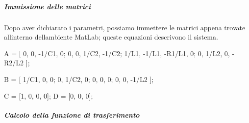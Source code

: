 \documentclass[
]{article}
\newenvironment{Shaded}{}{}
\newcommand{\FloatTok}[1]{\textcolor[rgb]{0.25,0.63,0.44}{#1}}
\newcommand{\NormalTok}[1]{#1}
\newcommand{\OperatorTok}[1]{\textcolor[rgb]{0.40,0.40,0.40}{#1}}
\newcommand{\VariableTok}[1]{\textcolor[rgb]{0.10,0.09,0.49}{#1}}
\begin{document}
\hypertarget{immissione-delle-matrici}{%
\subparagraph{Immissione delle matrici}\label{immissione-delle-matrici}}

Dopo aver dichiarato i parametri, possiamo immettere le matrici appena
trovate all\textquotesingle interno dell\textquotesingle ambiente
MatLab; queste equazioni descrivono il sistema.

\begin{Shaded}
\begin{Highlighting}[]
\VariableTok{A} \OperatorTok{=}\NormalTok{ [   }\FloatTok{0}\OperatorTok{,}      \FloatTok{0}\OperatorTok{,}      \OperatorTok{{-}}\FloatTok{1}\OperatorTok{/}\VariableTok{C1}\OperatorTok{,}      \FloatTok{0}\OperatorTok{;}
        \FloatTok{0}\OperatorTok{,}      \FloatTok{0}\OperatorTok{,}      \FloatTok{1}\OperatorTok{/}\VariableTok{C2}\OperatorTok{,}       \OperatorTok{{-}}\FloatTok{1}\OperatorTok{/}\VariableTok{C2}\OperatorTok{;}
        \FloatTok{1}\OperatorTok{/}\VariableTok{L1}\OperatorTok{,}   \OperatorTok{{-}}\FloatTok{1}\OperatorTok{/}\VariableTok{L1}\OperatorTok{,}  \OperatorTok{{-}}\VariableTok{R1}\OperatorTok{/}\VariableTok{L1}\OperatorTok{,}      \FloatTok{0}\OperatorTok{;}
        \FloatTok{0}\OperatorTok{,}      \FloatTok{1}\OperatorTok{/}\VariableTok{L2}\OperatorTok{,}   \FloatTok{0}\OperatorTok{,}          \OperatorTok{{-}}\VariableTok{R2}\OperatorTok{/}\VariableTok{L2}
\NormalTok{    ]}\OperatorTok{;}

\VariableTok{B} \OperatorTok{=}\NormalTok{ [   }\FloatTok{1}\OperatorTok{/}\VariableTok{C1}\OperatorTok{,}   \FloatTok{0}\OperatorTok{,}      \FloatTok{0}\OperatorTok{;}
        \FloatTok{0}\OperatorTok{,}      \FloatTok{1}\OperatorTok{/}\VariableTok{C2}\OperatorTok{,}   \FloatTok{0}\OperatorTok{;}
        \FloatTok{0}\OperatorTok{,}      \FloatTok{0}\OperatorTok{,}      \FloatTok{0}\OperatorTok{;}
        \FloatTok{0}\OperatorTok{,}      \FloatTok{0}\OperatorTok{,}      \OperatorTok{{-}}\FloatTok{1}\OperatorTok{/}\VariableTok{L2}
\NormalTok{    ]}\OperatorTok{;}

\VariableTok{C} \OperatorTok{=}\NormalTok{ [}\FloatTok{1}\OperatorTok{,} \FloatTok{0}\OperatorTok{,} \FloatTok{0}\OperatorTok{,} \FloatTok{0}\NormalTok{]}\OperatorTok{;}
\VariableTok{D} \OperatorTok{=}\NormalTok{ [}\FloatTok{0}\OperatorTok{,} \FloatTok{0}\OperatorTok{,} \FloatTok{0}\NormalTok{]}\OperatorTok{;}
\end{Highlighting}
\end{Shaded}

\hypertarget{calcolo-della-funzione-di-trasferimento}{%
\subparagraph{Calcolo della funzione di
trasferimento}\label{calcolo-della-funzione-di-trasferimento}}
\end{document}
